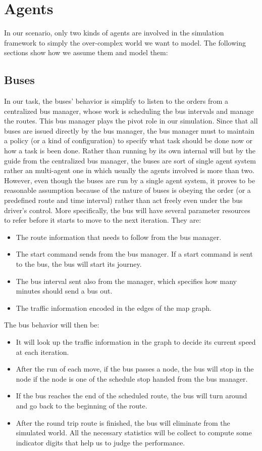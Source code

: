 \documentclass{sig-alternate}
\begin{document}
\section{Agents}

In our scenario, only two kinds of agents are involved in the simulation framework to simply the over-complex world we want to model. 
The following sections show how we assume them and model them:

\subsection{Buses}
In our task, the buses' behavior is simplify to listen to the orders from a centralized bus manager, whose work is scheduling the bus intervals and manage the routes. 
This bus manager plays the pivot role in our simulation. 
Since that all buses are issued directly by the bus manager, the bus manager must to maintain a policy (or a kind of configuration) to specify what task should be done now or how a task is been done.
Rather than running by its own internal will but by the guide from the centralized bus manager, the buses are sort of single agent system rather an multi-agent one in which usually the agents involved is more than two. 
However, even though the buses are run by a single agent system, it proves to be reasonable assumption because of the nature of buses is obeying the order (or a predefined route and time interval) rather than act freely even under the bus driver's control.
More specifically, the bus will have several parameter resources to refer before it starts to move to the next iteration. 
They are: 
\begin{itemize}
\item The route information that needs to follow from the bus manager. 
\item The start command sends from the bus manager. If a start command is sent to the bus, the bus will start its journey.
\item The bus interval sent also from the manager, which specifies how many minutes should send a bus out.
\item The traffic information encoded in the edges of the map graph.
\end{itemize}
The bus behavior will then be:
\begin{itemize}
\item It will look up the traffic information in the graph to decide its current speed at each iteration.
\item After the run of each move, if the bus passes a node, the bus will stop in the node if the node is one of the schedule stop handed from the bus manager.
\item If the bus reaches the end of the scheduled route, the bus will turn around and go back to the beginning of the route.
\item After the round trip route is finished, the bus will eliminate from the simulated world. All the necessary statistics will be collect to compute some indicator digits that help us to judge the performance.
\end{itemize}
\end{document}
